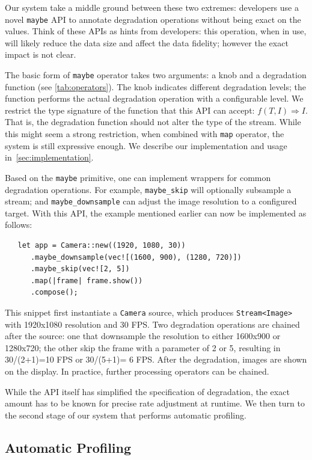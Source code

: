 Our system take a middle ground between these two extremes: developers use a
novel \texttt{maybe} API to annotate degradation operations without being exact
on the values. Think of these APIs as hints from developers: this operation,
when in use, will likely reduce the data size and affect the data fidelity;
however the exact impact is not clear.

The basic form of \texttt{maybe} operator takes two arguments: a knob and a
degradation function (see \autoref{tab:operators}). The knob indicates different
degradation levels; the function performs the actual degradation operation with
a configurable level. We restrict the type signature of the function that this
API can accept: $f(T, I) \Rightarrow I$. That is, the degradation function
should not alter the type of the stream. While this might seem a strong
restriction, when combined with \texttt{map} operator, the system is still
expressive enough. We describe our implementation and usage
in~\autoref{sec:implementation}.

Based on the \texttt{maybe} primitive, one can implement wrappers for common
degradation operations. For example, \texttt{maybe\_skip} will optionally
subsample a stream; and \texttt{maybe\_downsample} can adjust the image
resolution to a configured target. With this API, the example mentioned earlier
can now be implemented as follows:

\begin{lstlisting}
   let app = Camera::new((1920, 1080, 30))
      .maybe_downsample(vec![(1600, 900), (1280, 720)])
      .maybe_skip(vec![2, 5])
      .map(|frame| frame.show())
      .compose();
\end{lstlisting}

This snippet first instantiate a \texttt{Camera} source, which produces
\texttt{Stream<Image>} with 1920x1080 resolution and 30 FPS. Two degradation
operations are chained after the source: one that downsample the resolution to
either 1600x900 or 1280x720; the other skip the frame with a parameter of 2 or
5, resulting in 30/(2+1)=10 FPS or 30/(5+1)= 6 FPS. After the degradation,
images are shown on the display. In practice, further processing operators can
be chained.

While the API itself has simplified the specification of degradation, the exact
amount has to be known for precise rate adjustment at runtime. We then turn to
the second stage of our system that performs automatic profiling.

\subsection{Automatic Profiling}
\label{sec:automatic-profiling}

